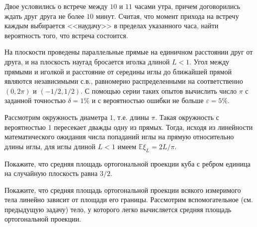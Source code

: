 \begin{problem}
Двое условились о встрече между $10$ и $11$ часами утра, причем договорились ждать друг друга не более $10$ минут. Считая, что 
момент прихода на встречу каждым выбирается <<наудачу>> в пределах указанного часа, найти вероятность того, что встреча состоится. 
\end{problem}


\begin{problem}
На плоскости проведены параллельные прямые на единичном расстоянии друг от друга, и на плоскость наугад бросается иголка длиной $L<1$. 
Угол между прямыми и иголкой и расстояние от середины иглы до ближайшей прямой являются независимыми с.в., равномерно распределенными 
на соответственно $(0,2\pi)$ и $(-1/2,1/2)$. С помощью серии таких опытов вычислить число $\pi$ с заданной точностью 
$\delta=1\%$ и с вероятностью ошибки не больше $\varepsilon=5\%$. 
\end{problem}

\begin{ordre}

Рассмотрим окружность диаметра $1$, т.е. длины $\pi$. Такая окружность с вероятностью $1$ пересекает дважды одну из прямых. 
Тогда, исходя из линейности математического ожидания числа попаданий иглы на прямую относительно длины иглы, для иглы длиной $L<1$ 
имеем ${\mathbb E}\xi_L = 2L/\pi$. 

\end{ordre}



\begin{problem}
Покажите, что средняя площадь ортогональной проекции куба с ребром единица на случайную плоскость равна $3/2$. 
\end{problem}

\begin{ordre}
Покажите, что  средняя площадь  ортогональной проекции всякого измеримого тела 
линейно зависит от площади его границы. 
Рассмотрим вспомогательное (см. предыдущую задачу) тело, у которого легко вычисляется средняя площадь ортогональной проекции. 
\end{ordre}

